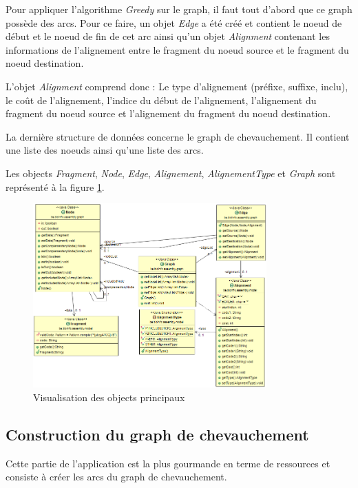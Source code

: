 \documentclass[12pt,a4paper,final]{article}
\begin{document}
Pour appliquer l'algorithme \textit{Greedy} sur le graph, il faut tout d'abord que ce graph possède des arcs.  Pour ce faire, un objet \textit{Edge} a été créé et contient le noeud de début et le noeud de fin de cet arc ainsi qu'un objet \textit{Alignment} contenant les informations de l'alignement entre le fragment du noeud source et le fragment du noeud destination.\medskip

L'objet \textit{Alignment} comprend donc : Le type d'alignement (préfixe, suffixe, inclu), le coût de l'alignement, l'indice du début de l'alignement, l'alignement du fragment du noeud source et l'alignement du fragment du noeud destination.\medskip

La dernière structure de données concerne le graph de chevauchement.  Il contient une liste des noeuds ainsi qu'une liste des arcs.

Les objects \textit{Fragment}, \textit{Node}, \textit{Edge}, \textit{Alignement}, \textit{AlignementType} et \textit{Graph} sont représenté à la figure \ref{UMLobj}.

\begin{figure}[!ht]
\centering
	\includegraphics[width=0.8\textwidth]{images/classDiagram_Objects.png}
	\caption{\label{UMLobj}Visualisation des objects principaux}
\end{figure}

\subsection{Construction du graph de chevauchement}

Cette partie de l'application est la plus gourmande en terme de ressources et consiste à créer les arcs du graph de chevauchement.\medskip
\end{document}
